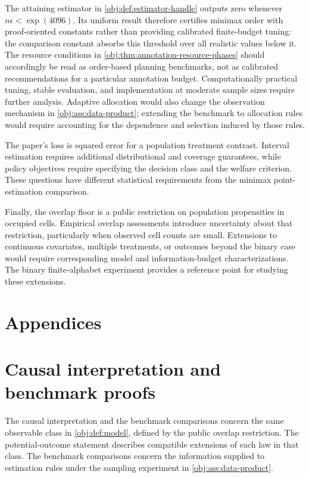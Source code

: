 \documentclass[11pt]{article}
\begin{document}
The attaining estimator in \cref{obj:def:estimator-handle} outputs zero whenever \(n\epsilon<\exp(4096)\). Its uniform result therefore certifies minimax order with proof-oriented constants rather than providing calibrated finite-budget tuning: the comparison constant absorbs this threshold over all realistic values below it. The resource conditions in \cref{obj:thm:annotation-resource-phases} should accordingly be read as order-based planning benchmarks, not as calibrated recommendations for a particular annotation budget. Computationally practical tuning, stable evaluation, and implementation at moderate sample sizes require further analysis. Adaptive allocation would also change the observation mechanism in \cref{obj:ass:data-product}; extending the benchmark to allocation rules would require accounting for the dependence and selection induced by those rules.

The paper's loss is squared error for a population treatment contrast. Interval estimation requires additional distributional and coverage guarantees, while policy objectives require specifying the decision class and the welfare criterion. These questions have different statistical requirements from the minimax point-estimation comparison.

Finally, the overlap floor is a public restriction on population propensities in occupied cells. Empirical overlap assessments introduce uncertainty about that restriction, particularly when observed cell counts are small. Extensions to continuous covariates, multiple treatments, or outcomes beyond the binary case would require corresponding model and information-budget characterizations. The binary finite-alphabet experiment provides a reference point for studying these extensions.


\appendix

\section*{Appendices}

\section{Causal interpretation and benchmark proofs}

The causal interpretation and the benchmark comparisons concern the same observable class in \cref{obj:def:model}, defined by the public overlap restriction. The potential-outcome statement describes compatible extensions of each law in that class. The benchmark comparisons concern the information supplied to estimation rules under the sampling experiment in \cref{obj:ass:data-product}.
\end{document}
